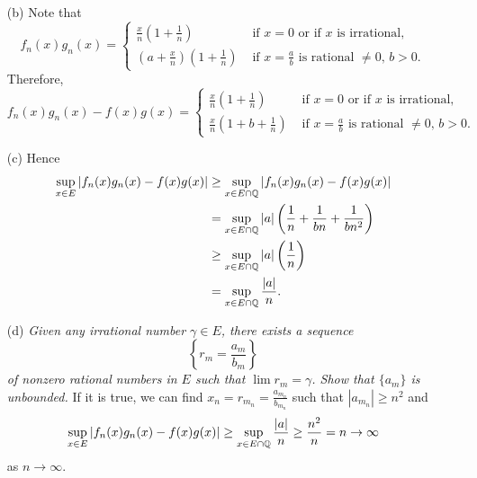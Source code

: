 \documentclass{article}
\begin{document}
\begin{enumerate}
\begin{enumerate}
    \item[(b)]
      Note that
      \begin{equation*}
      f_n(x) g_n(x) =
        \begin{cases}
          \frac{x}{n} \left( 1 + \frac{1}{n} \right)
            & \text{ if $x=0$ or if $x$ is irrational}, \\
          \left( a + \frac{x}{n} \right)\left( 1 + \frac{1}{n} \right)
            & \text{ if $x=\frac{a}{b}$ is rational $\neq 0$, $b>0$}.
        \end{cases}
      \end{equation*}
      Therefore,
      \begin{equation*}
      f_n(x) g_n(x) - f(x) g(x) =
        \begin{cases}
          \frac{x}{n} \left( 1 + \frac{1}{n} \right)
            & \text{ if $x=0$ or if $x$ is irrational}, \\
          \frac{x}{n} \left( 1 + b + \frac{1}{n} \right)
            & \text{ if $x=\frac{a}{b}$ is rational $\neq 0$, $b>0$}.
        \end{cases}
      \end{equation*}

    \item[(c)]
      Hence
      \begin{align*}
        \sup_{x \in E} |f_n(x) g_n(x) - f(x) g(x)|
        &\geq \sup_{x \in E \cap \mathbb{Q}} |f_n(x) g_n(x) - f(x) g(x)| \\
        &= \sup_{x \in E \cap \mathbb{Q}}
          \abs{a} \left( \frac{1}{n} + \frac{1}{bn} + \frac{1}{bn^2} \right) \\
        &\geq \sup_{x \in E \cap \mathbb{Q}}
          \abs{a} \left( \frac{1}{n} \right) \\
        &= \sup_{x \in E \cap \mathbb{Q}} \frac{\abs{a}}{n}.
      \end{align*}

    \item[(d)]
      \emph{Given any irrational number $\gamma \in E$,
      there exists a sequence
      \[
        \left\{ r_m = \frac{a_m}{b_m} \right\}
      \]
      of nonzero rational numbers in $E$ such that $\lim r_m = \gamma$.
      Show that $\{a_m\}$ is unbounded.}
      If it is true, we can find $x_n = r_{m_n} = \frac{a_{m_n}}{b_{m_n}}$
      such that $|a_{m_n}| \geq n^2$ and
      \[
        \sup_{x \in E} |f_n(x) g_n(x) - f(x) g(x)|
        \geq \sup_{x \in E \cap \mathbb{Q}} \frac{\abs{a}}{n}
        \geq \frac{n^2}{n}
        = n \to \infty
      \]
      as $n \to \infty$.


\end{enumerate}
\end{enumerate}
\end{document}
